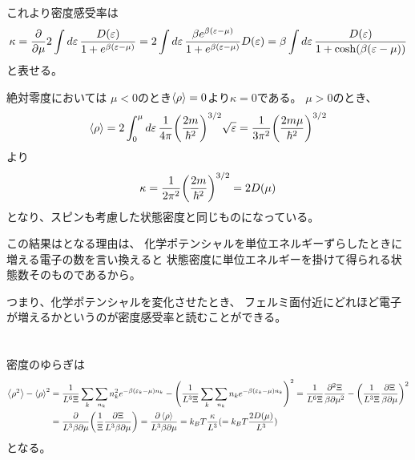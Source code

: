 \documentclass[../ap_2011.tex]{subfiles}
\begin{document}
これより密度感受率は
\begin{equation}\begin{aligned}[b]
    \kappa = \pdv{\mu}2\int d\varepsilon\,\frac{D(\varepsilon)}{1+e^{\beta(\varepsilon-\mu)}}
    =2\int d\varepsilon\,\frac{\beta e^{\beta(\varepsilon-\mu)}}{1+e^{\beta(\varepsilon-\mu)}}D(\varepsilon)
    =\beta\int d\varepsilon\,\frac{D(\varepsilon)}{1+\cosh(\beta(\varepsilon-\mu))}
\end{aligned}\end{equation}
と表せる。

絶対零度においては
\(\mu<0\)のとき\(\ev{\rho}=0\)より\(\kappa=0\)である。
\(\mu>0\)のとき、
\begin{equation}\begin{aligned}[b]
    \ev{\rho} = 2\int_0^\mu d\varepsilon\, \frac{1}{4\pi}\qty(\frac{2m}{\hbar^2})^{3/2}\sqrt{\varepsilon}
    =\frac{1}{3\pi^2}\qty(\frac{2m\mu}{\hbar^2})^{3/2}
\end{aligned}\end{equation}
より
\begin{equation}\begin{aligned}[b]
    \kappa = \frac{1}{2\pi^2}\qty(\frac{2m}{\hbar^2})^{3/2}=2D(\mu)
\end{aligned}\end{equation}
となり、スピンも考慮した状態密度と同じものになっている。

この結果はとなる理由は、
化学ポテンシャルを単位エネルギーずらしたときに増える電子の数を言い換えると
状態密度に単位エネルギーを掛けて得られる状態数そのものであるから。

つまり、化学ポテンシャルを変化させたとき、
フェルミ面付近にどれほど電子が増えるかというのが密度感受率と読むことができる。

\section{}
密度のゆらぎは
\begin{equation}\begin{aligned}[b]
    \ev{\rho^2}-\ev{\rho}^2
    &=\frac{1}{L^6\Xi}\sum_k\sum_{n_k}n_k^2e^{-\beta(\varepsilon_k-\mu)n_k}-\qty(\frac{1}{L^3\Xi}\sum_k\sum_{n_k}n_ke^{-\beta(\varepsilon_k-\mu)n_k})^2
    =\frac{1}{L^6\Xi}\frac{\partial^2\Xi}{\beta\partial\mu^2}-\qty(\frac{1}{L^3\Xi}\frac{\partial\Xi}{\beta\partial\mu})^2\\
    &=\frac{\partial}{L^3\beta\partial\mu}\qty(\frac{1}{\Xi}\frac{\partial \Xi}{L^3\beta\partial\mu})
    =\frac{\partial\ev{\rho}}{L^3\beta\partial\mu} = k_BT\frac{\kappa}{L^3} (= k_BT \frac{2D(\mu)}{L^3})
\end{aligned}\end{equation}
となる。
\end{document}

